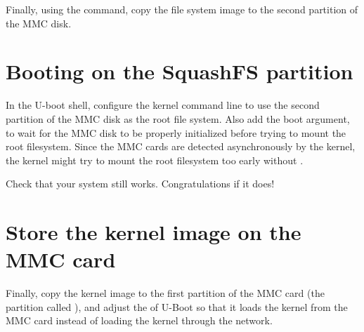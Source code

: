 Finally, using the  command, copy the file system image to
the second partition of the MMC disk.

\section{Booting on the SquashFS partition}

In the U-boot shell, configure the kernel command line to use the
second partition of the MMC disk as the root file system. Also add the
 boot argument, to wait for the MMC disk to be properly
initialized before trying to mount the root filesystem. Since the MMC
cards are detected asynchronously by the kernel, the kernel might try
to mount the root filesystem too early without .

Check that your system still works. Congratulations if it does!

\section{Store the kernel image on the MMC card}

Finally, copy the  kernel image to the first partition of
the MMC card (the partition called ), and adjust the
 of U-Boot so that it loads the kernel from the MMC card
instead of loading the kernel through the network.
